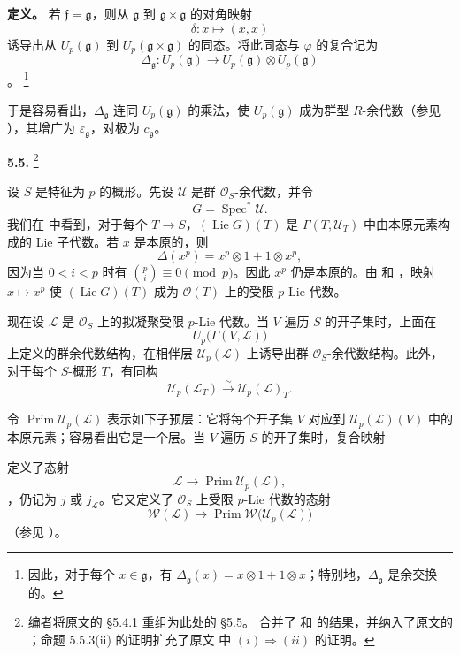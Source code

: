 \medskip
\noindent\textbf{定义。}
\label{sga3:VIIA:5.4-comultiplication-definition}
若 \(\mathfrak f=\mathfrak g\)，则从 \(\mathfrak g\) 到 \(\mathfrak g\times\mathfrak g\) 的对角映射
\[
  \delta:x\longmapsto(x,x)
\]
诱导出从 \(U_p(\mathfrak g)\) 到 \(U_p(\mathfrak g\times\mathfrak g)\) 的同态。将此同态与 \(\varphi\) 的复合记为
\[
  \Delta_{\mathfrak g}:
  U_p(\mathfrak g)
  \longrightarrow
  U_p(\mathfrak g)\otimes U_p(\mathfrak g)
\]
。
\footnote{因此，对于每个 \(x\in\mathfrak g\)，有 \(\Delta_{\mathfrak g}(x)=x\otimes1+1\otimes x\)；特别地，\(\Delta_{\mathfrak g}\) 是余交换的。}

于是容易看出，\(\Delta_{\mathfrak g}\) 连同 \(U_p(\mathfrak g)\) 的乘法，使 \(U_p(\mathfrak g)\) 成为群型 \(R\)-余代数（参见 ），其增广为 \(\varepsilon_{\mathfrak g}\)，对极为 \(c_{\mathfrak g}\)。

\medskip
\noindent\textbf{5.5.}
\label{sga3:VIIA:5.5}
\footnote{编者将原文的 \S5.4.1 重组为此处的 \S5.5。 合并了  和  的结果，并纳入了原文的 ；命题 5.5.3(ii) 的证明扩充了原文  中 \((i)\Rightarrow(ii)\) 的证明。}

设 \(S\) 是特征为 \(p\) 的概形。先设 \(\mathcal U\) 是群 \(\mathcal O_S\)-余代数，并令
\[
  G=\operatorname{Spec}^{*}\mathcal U.
\]
我们在  中看到，对于每个 \(T\to S\)，\((\operatorname{Lie}G)(T)\) 是 \(\Gamma(T,\mathcal U_T)\) 中由本原元素构成的 Lie 子代数。若 \(x\) 是本原的，则
\[
  \Delta(x^p)
  =
  x^p\otimes1+1\otimes x^p,
\]
因为当 \(0<i<p\) 时有 \(\binom pi\equiv0\pmod p\)。因此 \(x^p\) 仍是本原的。由  和 ，映射 \(x\mapsto x^p\) 使 \((\operatorname{Lie}G)(T)\) 成为 \(\mathcal O(T)\) 上的受限 \(p\)-Lie 代数。

现在设 \(\mathcal L\) 是 \(\mathcal O_S\) 上的拟凝聚受限 \(p\)-Lie 代数。当 \(V\) 遍历 \(S\) 的开子集时，上面在
\[
  U_p\bigl(\Gamma(V,\mathcal L)\bigr)
\]
上定义的群余代数结构，在相伴层 \(\mathcal U_p(\mathcal L)\) 上诱导出群 \(\mathcal O_S\)-余代数结构。此外，对于每个 \(S\)-概形 \(T\)，有同构
\[
  \mathcal U_p(\mathcal L_T)
  \xrightarrow{\sim}
  \mathcal U_p(\mathcal L)_T.
\]

令 \(\operatorname{Prim}\mathcal U_p(\mathcal L)\) 表示如下子预层：它将每个开子集 \(V\) 对应到 \(\mathcal U_p(\mathcal L)(V)\) 中的本原元素；容易看出它是一个层。当 \(V\) 遍历 \(S\) 的开子集时，复合映射
\begin{center}
  \label{sga3:VIIA:5.5-primitive-sheaf-sequence}
  
\end{center}
定义了态射
\[
  \mathcal L
  \longrightarrow
  \operatorname{Prim}\mathcal U_p(\mathcal L),
\]
，仍记为 \(j\) 或 \(j_{\mathcal L}\)。它又定义了 \(\mathcal O_S\) 上受限 \(p\)-Lie 代数的态射
\[
  \mathcal W(\mathcal L)
  \longrightarrow
  \operatorname{Prim}
    \mathcal W\bigl(\mathcal U_p(\mathcal L)\bigr)
\]
（参见 ）。

